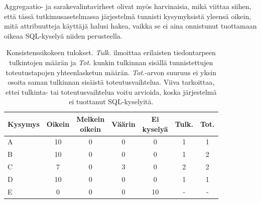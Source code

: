 Aggregaatio- ja sarakevalintavirheet olivat myös harvinaisia, mikä viittaa siihen, että tässä tutkimusasetelmassa järjestelmä tunnisti kysymyksistä yleensä oikein, mitä attribuutteja käyttäjä halusi hakea, vaikka se ei aina onnistunut tuottamaan oikeaa SQL-kyselyä niiden perusteella.

\renewcommand{\arraystretch}{1.1}
\begin{table}[h]
  \centering
  \caption{Konsistenssikokeen tulokset. \textit{Tulk.} ilmoittaa
    erilaisten tiedontarpeen tulkintojen määrän ja \textit{Tot.}
    kunkin tulkinnan sisällä tunnistettujen toteutustapojen
    yhteenlasketun määrän. \textit{Tot.}-arvon suuruus ei yksin
    osoita saman tulkinnan sisäistä toteutusvaihtelua. Viiva
    tarkoittaa, ettei tulkinta- tai toteutusvaihtelua voitu
  arvioida, koska järjestelmä ei tuottanut SQL-kyselyitä.}
  \label{tb:consistency}
  \setlength{\tabcolsep}{4pt}
  {\small
    \begin{tabular}{lcccccc}
      \toprule
      Kysymys & Oikein & \makecell{Melkein\\oikein} & Väärin &
      \makecell{Ei\\kyselyä} & Tulk. & Tot. \\
      \midrule
      A & 10 & 0 & 0 & 0  & 1 & 1 \\
      B & 10 & 0 & 0 & 0  & 1 & 2 \\
      C & 7  & 0 & 3 & 0  & 2 & 2 \\
      D & 10 & 0 & 0 & 0  & 1 & 1 \\
      E & 0  & 0 & 0 & 10 & - & - \\
      \bottomrule
    \end{tabular}
  }
\end{table}

